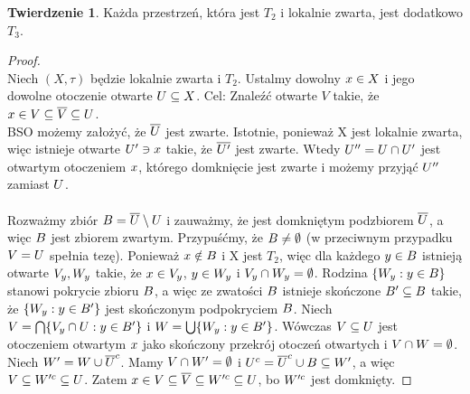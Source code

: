 \documentclass[12pt, a4paper, 2.5cm]{article}
\theoremstyle{definition}
\newtheorem{theorem}{Twierdzenie}
\begin{document}
	\begin{theorem}
		Każda przestrzeń, która jest $T_2$ i lokalnie zwarta, jest dodatkowo $T_3$.
	\end{theorem}
	\begin{proof}
		~\\
		Niech $(X,\tau)$ będzie lokalnie zwarta i $T_2$. Ustalmy dowolny $\mathnormal{x}\in X$ i jego dowolne otoczenie otwarte $\mathnormal{U}\subseteq X$. Cel: Znaleźć otwarte $V$ takie, że $\mathnormal{x}\in\mathnormal{V}\subseteq\mathnormal{\overline{V}}\subseteq\mathnormal{U}$.
		~\\ BSO możemy założyć, że $\mathnormal{\overline{U}}$ jest zwarte. Istotnie, ponieważ X jest lokalnie zwarta, więc istnieje otwarte $\mathnormal{U'}\ni\mathnormal{x}$ takie, że $\mathnormal{\overline{U'}}$ jest zwarte. Wtedy $\mathnormal{U''}=\mathnormal{U}\cap\mathnormal{U'}$ jest otwartym otoczeniem $\mathnormal{x}$, którego domknięcie jest zwarte i możemy przyjąć $\mathnormal{U''}$ zamiast $\mathnormal{U}$.
		~\\~\\ Rozważmy zbiór $\mathnormal{B}=\mathnormal{\overline{U}}\setminus\mathnormal{U}$ i zauważmy, że jest domkniętym podzbiorem $\mathnormal{\overline{U}}$, a więc $\mathnormal{B}$ jest zbiorem zwartym. Przypuśćmy, że $\mathnormal{B}\neq\emptyset$ (w przeciwnym przypadku $\mathnormal{V}=\mathnormal{U}$ spełnia tezę).
		Ponieważ $\mathnormal{x}\notin\mathnormal{B}$ i X jest $T_2$, więc  dla każdego $\mathnormal{y}\in\mathnormal{B}$ istnieją otwarte $\mathnormal{V_y},\mathnormal{W_y}$ takie, że $\mathnormal{x}\in\mathnormal{V_y}$, $\mathnormal{y}\in\mathnormal{W_y}$ i $\mathnormal{V_y}\cap \mathnormal{W_y}=\emptyset$. Rodzina $\{\mathnormal{W_y:y\in B}\}$ stanowi pokrycie zbioru $\mathnormal{B}$, a więc ze zwatości $\mathnormal{B}$ istnieje skończone $\mathnormal{B'}\subseteq\mathnormal{B}$ takie, że $\{\mathnormal{W_y:y\in B'}\}$ jest skończonym podpokryciem $\mathnormal{B}$. Niech $\mathnormal{V}=\bigcap\{\mathnormal{V_y\cap\mathnormal{U}:y\in B'}\}$ i $\mathnormal{W}=\bigcup\{\mathnormal{W_y:y\in B'\}}$. Wówczas $\mathnormal{V\subseteq\mathnormal{U}}$ jest otoczeniem otwartym $\mathnormal{x}$ jako skończony przekrój otoczeń otwartych i $\mathnormal{V}\cap\mathnormal{W}=\emptyset$. Niech $\mathnormal{W'}=\mathnormal{W}\cup\mathnormal{\overline{U}^c}$. Mamy $\mathnormal{V}\cap\mathnormal{W'}=\emptyset$ i $\mathnormal{U^c}=\mathnormal{\overline{U}^c}\cup\mathnormal{B}\subseteq\mathnormal{W'}$, a więc $\mathnormal{V}\subseteq\mathnormal{W'^c}\subseteq\mathnormal{U}$. Zatem $\mathnormal{x}\in\mathnormal{V}\subseteq\mathnormal{\overline{V}}\subseteq\mathnormal{W'^c}\subseteq\mathnormal{U}$, bo $\mathnormal{W'^c}$ jest domknięty.
	\end{proof}
\end{document}
